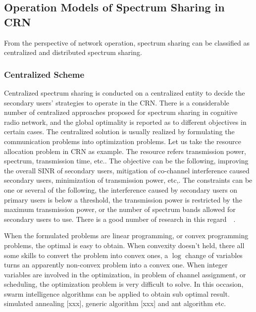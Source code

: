 \subsection{Operation Models of Spectrum Sharing in CRN}
From the perspective of network operation, spectrum sharing can be classified as centralized and distributed spectrum sharing.


\subsubsection*{Centralized Scheme}
Centralized spectrum sharing is conducted on a centralized entity to decide the secondary users' strategies to operate in the CRN.
There is a considerable number of centralized approaches proposed for spectrum sharing in cognitive radio network, and the global optimality is reported as to different objectives in certain cases.
%
The centralized solution is usually realized by formulating the communication problems into optimization problems.
Let us take the resource allocation problem in CRN as example.
The resource refers transmission power, spectrum, transmission time, etc..
The objective can be the following, improving the overall SINR of secondary users, mitigation of co-channel interference caused secondary users, minimization of transmission power, etc,.
The constraints can be one or several of the following, the interference caused by secondary users on primary users is below a threshold, the transmission power is restricted by the maximum transmission power, or the number of spectrum bands allowed for secondary users to use.
There is a good number of research in this regard~\cite{resource_allocation_crn_Ahmad_2015}~\cite[Chapter~6]{Han:2008:RAW:1457343}.

When the formulated problems are linear programming, or convex programming problems, the optimal is easy to obtain.
When convexity doesn't held, there all some skills to convert the problem into convex ones, \eg a $\log$ change of variables turns an apparently non-convex problem into a convex one.
When integer variables are involved in the optimization, \eg in problem of channel assignment, or scheduling, the optimization problem is very difficult to solve.
In this occasion, swarm intelligence algorithms can be applied to obtain sub optimal result.
simulated annealing [xxx], generic algorithm [xxx] and ant algorithm etc.

